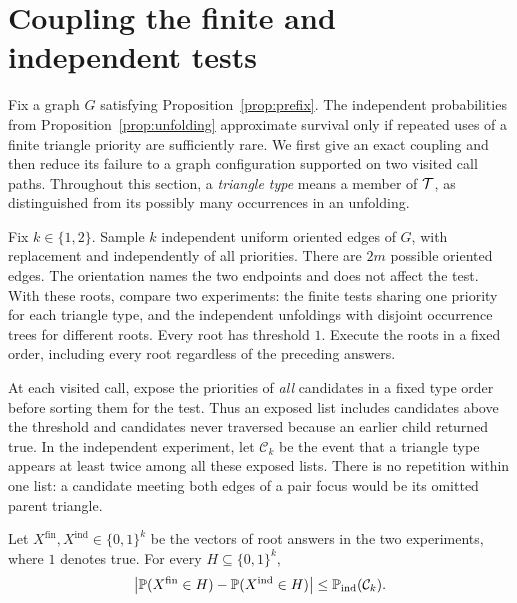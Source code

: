 \section{Coupling the finite and independent tests}
\label{sec:coupling}

Fix a graph $G$ satisfying Proposition~\ref{prop:prefix}.
The independent probabilities from Proposition~\ref{prop:unfolding}
approximate survival only if repeated uses of a finite triangle priority
are sufficiently rare.  We first give an exact coupling and then reduce
its failure to a graph configuration supported on two visited call paths.
Throughout this section, a \emph{triangle type} means a member of $\mathcal T$,
as distinguished from its possibly many occurrences in an unfolding.

Fix $k\in\{1,2\}$.  Sample $k$ independent uniform oriented edges of $G$,
with replacement and independently of all priorities.  There are $2m$
possible oriented edges.  The orientation names the two endpoints and
does not affect the test.  With these roots, compare two experiments:
the finite tests sharing one priority for each triangle type, and the
independent unfoldings with disjoint occurrence trees for different
roots.  Every root has threshold $1$.  Execute the roots in a fixed
order, including every root regardless of the preceding answers.

At each visited call, expose the priorities of \emph{all} candidates in
a fixed type order before sorting them for the test.  Thus an exposed
list includes candidates above the threshold and candidates never
traversed because an earlier child returned true.  In the independent
experiment, let $\mathcal C_k$ be the event that a triangle type appears
at least twice among all these exposed lists.  There is no repetition
within one list: a candidate meeting both edges of a pair focus would
be its omitted parent triangle.

\begin{lemma}
\label{lem:coupling}
Let $X^{\mathrm{fin}},X^{\mathrm{ind}}\in\{0,1\}^k$ be the vectors of
root answers in the two experiments, where $1$ denotes true.
For every $H\subseteq\{0,1\}^k$,
\[
 \bigl|\mathbb P(X^{\mathrm{fin}}\in H)
       -\mathbb P(X^{\mathrm{ind}}\in H)\bigr|
 \le \mathbb P_{\mathrm{ind}}(\mathcal C_k).
\]
\end{lemma}

